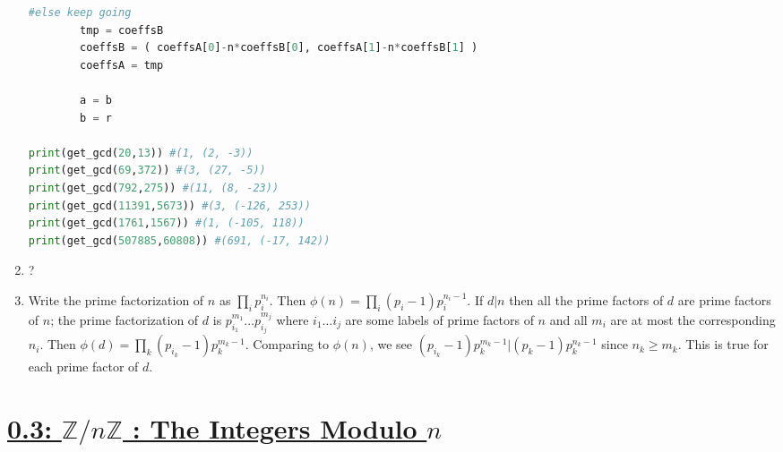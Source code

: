 \documentclass[]{article}
\newcommand{\bbz}{\mathbb{Z}}
\begin{document}
\begin{enumerate}
\begin{lstlisting}[language=Python]
        #else keep going
        tmp = coeffsB
        coeffsB = ( coeffsA[0]-n*coeffsB[0], coeffsA[1]-n*coeffsB[1] )
        coeffsA = tmp

        a = b
        b = r

print(get_gcd(20,13)) #(1, (2, -3))
print(get_gcd(69,372)) #(3, (27, -5))
print(get_gcd(792,275)) #(11, (8, -23))
print(get_gcd(11391,5673)) #(3, (-126, 253))
print(get_gcd(1761,1567)) #(1, (-105, 118))
print(get_gcd(507885,60808)) #(691, (-17, 142))
\end{lstlisting}
\item {\color{red} ?}
\item Write the prime factorization of $n$ as $\prod_i p_i^{n_i}$. Then $\phi(n) = \prod_i (p_i-1)p_i^{n_i-1}$. If $d \vert n$ then all the prime factors of $d$ are prime factors of $n$; the prime factorization of $d$ is $p_{i_1}^{m_1} \ldots p_{i_j}^{m_j}$ where $i_1 \ldots i_j$ are some labels of prime factors of $n$ and all $m_i$ are at most the corresponding $n_i$. Then $\phi(d) = \prod_k (p_{i_k}-1)p_k^{m_k-1}$. Comparing to $\phi(n)$, we see $(p_{i_k}-1)p_k^{m_k-1} \vert (p_k-1)p_k^{n_k-1}$ since $n_k \geq m_k$. This is true for each prime factor of $d$.
\end{enumerate}





\section*{\underline{0.3: $\bbz/n\bbz$ : The Integers Modulo $n$}}
\end{document}
